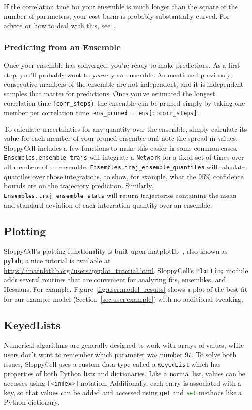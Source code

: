 \documentclass[12pt]{article}
\makeatletter
\newcommand{\py}[1]{\lstinline[language=Python, showstringspaces=False]@#1@}
\makeatother
\begin{document}
If the correlation time for your ensemble is much longer than the square of the number of parameters, your cost basin is probably substantially curved.
For advice on how to deal with this, see~\cite[Section 6.3]{bib:GutenkunstPhD}.

\subsubsection{Predicting from an Ensemble}

Once your ensemble has converged, you're ready to make predictions.
As a first step, you'll probably want to \emph{prune} your ensemble.
As mentioned previously, consecutive members of the ensemble are not independent, and it is independent samples that matter for predictions.
Once you've estimated the longest correlation time (\py{corr_steps}), the ensemble can be pruned simply by taking one member per correlation time: \py{ens_pruned = ens[::corr_steps]}.

To calculate uncertainties for any quantity over the ensemble, simply calculate its value for each member of your pruned ensemble and note the spread in values.
SloppyCell includes a few functions to make this easier in some common cases.
\py{Ensembles.ensemble_trajs} will integrate a \py{Network} for a fixed set of times over all members of an ensemble.
\py{Ensembles.traj_ensemble_quantiles} will calculate quantiles over those integrations, to show, for example, what the 95\% confidence bounds are on the trajectory prediction.
Similarly, \py{Ensembles.traj_ensemble_stats} will return trajectories containing the mean and standard deviation of each integration quantity over an ensemble.

\subsection{Plotting}

SloppyCell's plotting functionality is built upon matplotlib~\cite{bib:Hunter2007}, also known as \py{pylab}; a nice tutorial is available at \url{https://matplotlib.org/users/pyplot_tutorial.html}.
SloppyCell's \py{Plotting} module adds several routines that are convenient for analyzing fits, ensembles, and Hessians.
For example, Figure~\ref{fig:user:model_results} shows a plot of the best fit for our example model (Section~\ref{sec:user:example}) with no additional tweaking.

\subsection{KeyedLists}
Numerical algorithms are generally designed to work with arrays of values, while users don't want to remember which parameter was number 97.
To solve both issues, SloppyCell uses a custom data type called a \py{KeyedList} which has properties of both Python lists and dictionaries.
Like a normal list, values can be accesses using \py{[<index>]} notation.
Additionally, each entry is associated with a key, so that values can be added and accessed using \py{get} and \py{set} methods like a Python dictionary.
\end{document}
